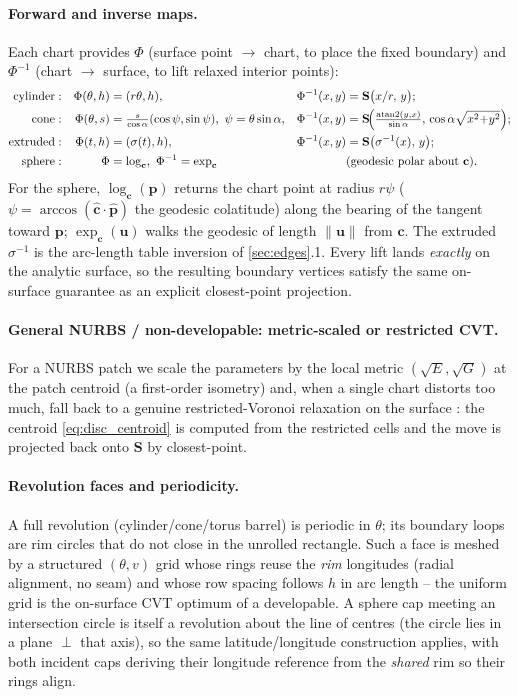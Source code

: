 \documentclass[11pt,a4paper]{article}
\numberwithin{equation}{section}
\newcommand{\norm}[1]{\left\lVert #1 \right\rVert}
\newcommand{\vv}[1]{\mathbf{#1}}
\begin{document}
\paragraph{Forward and inverse maps.}
Each chart provides $\Phi$ (surface point $\to$ chart, to place the fixed
boundary) and $\Phi^{-1}$ (chart $\to$ surface, to lift relaxed interior points):
\begin{align}
\label{eq:chartmaps}
\text{cylinder}&: & \Phi(\theta,h)&=(r\theta,h), &
   \Phi^{-1}(x,y)&=\vv{S}\bigl(x/r,\,y\bigr);\notag\\
\text{cone}&: & \Phi(\theta,s)&=\tfrac{s}{\cos\alpha}(\cos\psi,\sin\psi),\
   \psi=\theta\sin\alpha, &
   \Phi^{-1}(x,y)&=\vv{S}\!\Bigl(\tfrac{\operatorname{atan2}(y,x)}{\sin\alpha},\,
     \cos\alpha\sqrt{x^2{+}y^2}\Bigr);\\
\text{extruded}&: & \Phi(t,h)&=(\sigma(t),h), &
   \Phi^{-1}(x,y)&=\vv{S}\bigl(\sigma^{-1}(x),\,y\bigr);\notag\\
\text{sphere}&: & \Phi&=\log_{\vv c},\ \Phi^{-1}=\exp_{\vv c}
   &&\text{(geodesic polar about $\vv c$).}\notag
\end{align}
For the sphere, $\log_{\vv c}(\vv{p})$ returns the chart point at radius $r\psi$
($\psi=\arccos(\hat{\vv c}\!\cdot\!\hat{\vv p})$ the geodesic colatitude) along
the bearing of the tangent toward $\vv{p}$; $\exp_{\vv c}(\vv{u})$ walks the
geodesic of length $\norm{\vv{u}}$ from $\vv c$. The extruded $\sigma^{-1}$ is
the arc-length table inversion of \cref{sec:edges}.1. Every lift lands
\emph{exactly} on the analytic surface, so the resulting boundary vertices
satisfy the same on-surface guarantee as an explicit closest-point projection.

\paragraph{General NURBS / non-developable: metric-scaled or restricted CVT.}
For a NURBS patch we scale the parameters by the local metric
$(\sqrt{E},\sqrt{G})$ at the patch centroid (a first-order isometry) and, when a
single chart distorts too much, fall back to a genuine restricted-Voronoi
relaxation on the surface \cite{YanLevy2009,LevyLiu2010}: the centroid
\eqref{eq:disc_centroid} is computed from the restricted cells and the move is
projected back onto $\vv{S}$ by closest-point.

\paragraph{Revolution faces and periodicity.}
A full revolution (cylinder/cone/torus barrel) is periodic in $\theta$; its
boundary loops are rim circles that do not close in the unrolled rectangle.
Such a face is meshed by a structured $(\theta,v)$ grid whose rings reuse the
\emph{rim} longitudes (radial alignment, no seam) and whose row spacing follows
$h$ in arc length -- the uniform grid is the on-surface CVT optimum of a
developable. A sphere cap meeting an intersection circle is itself a revolution
about the line of centres (the circle lies in a plane $\perp$ that axis), so the
same latitude/longitude construction applies, with both incident caps deriving
their longitude reference from the \emph{shared} rim so their rings align.
\end{document}
